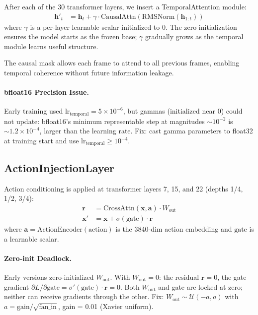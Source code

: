 \documentclass[10pt,twocolumn]{article}
\begin{document}
After each of the 30 transformer layers, we insert a TemporalAttention module:
\begin{align}
  \mathbf{h}'_t &= \mathbf{h}_t + \gamma \cdot \text{CausalAttn}(\text{RMSNorm}(\mathbf{h}_{1:t}))
\end{align}
where $\gamma$ is a per-layer learnable scalar initialized to 0. The zero initialization ensures the model starts as the frozen base; $\gamma$ gradually grows as the temporal module learns useful structure.

The causal mask allows each frame to attend to all previous frames, enabling temporal coherence without future information leakage.

\paragraph{bfloat16 Precision Issue.}
Early training used $\text{lr}_\text{temporal} = 5 \times 10^{-6}$, but gammas (initialized near 0) could not update: bfloat16's minimum representable step at magnitudes $\sim 10^{-2}$ is $\sim 1.2 \times 10^{-4}$, larger than the learning rate. Fix: cast gamma parameters to float32 at training start and use $\text{lr}_\text{temporal} \geq 10^{-4}$.

\subsection{ActionInjectionLayer}

Action conditioning is applied at transformer layers 7, 15, and 22 (depths 1/4, 1/2, 3/4):
\begin{align}
  \mathbf{r} &= \text{CrossAttn}(\mathbf{x}, \mathbf{a}) \cdot W_\text{out} \\
  \mathbf{x}' &= \mathbf{x} + \sigma(\text{gate}) \cdot \mathbf{r}
\end{align}
where $\mathbf{a} = \text{ActionEncoder}(\text{action})$ is the 3840-dim action embedding and $\text{gate}$ is a learnable scalar.

\paragraph{Zero-init Deadlock.}
Early versions zero-initialized $W_\text{out}$. With $W_\text{out} = 0$: the residual $\mathbf{r} = 0$, the gate gradient $\partial L / \partial \text{gate} = \sigma'(\text{gate}) \cdot \mathbf{r} = 0$. Both $W_\text{out}$ and gate are locked at zero; neither can receive gradients through the other. Fix: $W_\text{out} \sim \mathcal{U}(-a, a)$ with $a = \text{gain}/\sqrt{\text{fan\_in}}$, gain = 0.01 (Xavier uniform).
\end{document}
